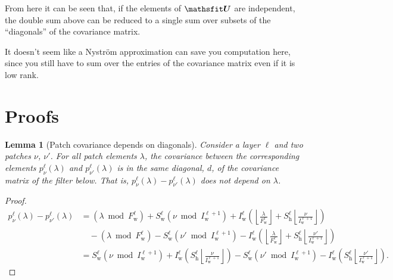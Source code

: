 \documentclass{article} %
\newcommand{\bracket}[3]{{\left#1 #3 \right#2}}
\newcommand{\bra}{\bracket{(}{)}}
\newcommand{\floor}{\bracket{\lfloor}{\rfloor}}
\newcommand{\ssup}[1]{^{#1}}
\newcommand{\patch}[2]{{p\ssup{#1}_{#2}}}
\newcommand{\p}[2]{{\patch{\ell #1}{\nu #2}\bra{\lambda}}}
\newcommand{\Iw}[1]{{I\ssup{#1}_\text{w}}}
\newcommand{\Iwl}[1]{\Iw{\ell #1}}
\newcommand{\Sw}[1]{{S\ssup{#1}_\text{w}}}
\newcommand{\Swl}[1]{\Sw{\ell #1}}
\newcommand{\Sh}[1]{{S\ssup{#1}_\text{h}}}
\newcommand{\Shl}[1]{\Sh{\ell #1}}
\newcommand{\Fw}[1]{{F\ssup{#1}_\text{w}}}
\newcommand{\Fwl}[1]{\Fw{\ell #1}}
\newtheorem{lemma}[theorem]{Lemma}
\begin{document}
From here it can be seen that, if the elements of $\tU$ are independent, the double sum above can be reduced to a single sum over subsets of the ``diagonals'' of the covariance matrix.

It doesn't seem like a Nyström approximation can save you computation here, since you still have to sum over the entries of the covariance matrix even if it is low rank.
\appendix

\section{Proofs}

\begin{lemma}[Patch covariance depends on diagonals]
  Consider a layer $\ell$ and two patches $\nu$, $\nu'$. For all patch elements $\lambda$, the covariance between the corresponding elements
  $\p{}{}$ and $\p{}{'}$ is in the same diagonal,
  $d$, of the covariance matrix of the filter below. That is,
  $\p{}{} - \p{}{'}$ does not depend on $\lambda$.
  \label{lemma:patches-are-diagonal}
\end{lemma}
\begin{proof}
\begin{align*}
\p{}{}{} - \p{}{'}{}
  &= \bra{\lambda \bmod \Fwl{}} + \Swl{}\bra{\nu\bmod \Iwl{+1}}
  + \Iwl{}\bra{\floor{\frac{\lambda}{\Fwl{}}} + \Shl{} \floor{\frac{\nu}{\Iwl{+1}}}} \\
  &\hspace{1em}- \bra{\lambda \bmod \Fwl{}} - \Swl{}\bra{\nu'\bmod \Iwl{+1}}
    - \Iwl{}\bra{\floor{\frac{\lambda}{\Fwl{}}} + \Shl{} \floor{\frac{\nu'}{\Iwl{+1}}}} \\
  &=\Swl{}\bra{\nu\bmod \Iwl{+1}} +
    \Iwl{}\bra{\Shl{} \floor{\frac{\nu}{\Iwl{+1}}}}
    -\Swl{}\bra{\nu'\bmod \Iwl{+1}} -
    \Iwl{}\bra{\Shl{} \floor{\frac{\nu'}{\Iwl{+1}}}}.
\end{align*}
\end{proof}
\end{document}
